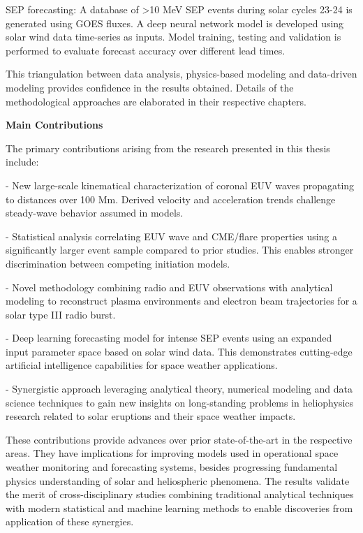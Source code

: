 SEP forecasting: A database of >10 MeV SEP events during solar cycles 23-24 is generated using GOES fluxes. A deep neural network model is developed using solar wind data time-series as inputs. Model training, testing and validation is performed to evaluate forecast accuracy over different lead times.

This triangulation between data analysis, physics-based modeling and data-driven modeling provides confidence in the results obtained. Details of the methodological approaches are elaborated in their respective chapters.

\textbf{Main Contributions}

The primary contributions arising from the research presented in this thesis include:

- New large-scale kinematical characterization of coronal EUV waves propagating to distances over 100 Mm. Derived velocity and acceleration trends challenge steady-wave behavior assumed in models. 

- Statistical analysis correlating EUV wave and CME/flare properties using a significantly larger event sample compared to prior studies. This enables stronger discrimination between competing initiation models.

- Novel methodology combining radio and EUV observations with analytical modeling to reconstruct plasma environments and electron beam trajectories for a solar type III radio burst.

- Deep learning forecasting model for intense SEP events using an expanded input parameter space based on solar wind data. This demonstrates cutting-edge artificial intelligence capabilities for space weather applications.

- Synergistic approach leveraging analytical theory, numerical modeling and data science techniques to gain new insights on long-standing problems in heliophysics research related to solar eruptions and their space weather impacts. 

These contributions provide advances over prior state-of-the-art in the respective areas. They have implications for improving models used in operational space weather monitoring and forecasting systems, besides progressing fundamental physics understanding of solar and heliospheric phenomena. The results validate the merit of cross-disciplinary studies combining traditional analytical techniques with modern statistical and machine learning methods to enable discoveries from application of these synergies.

